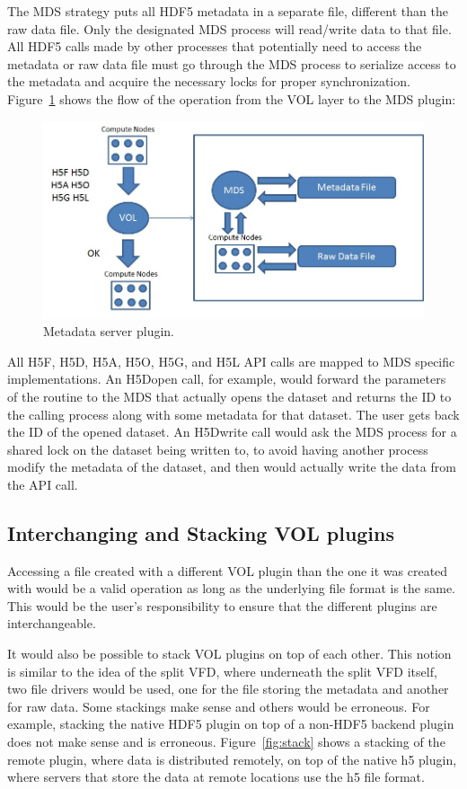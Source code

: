 \documentclass[letterpaper,hyper]{THG_RFC}
\begin{document}
The MDS strategy puts all HDF5 metadata in a separate file, different than the raw data file. Only the designated MDS process will read/write data to that file. All HDF5 calls made by other processes that potentially need to access the metadata or raw data file must go through the MDS process to serialize access to the metadata and acquire the necessary locks for proper synchronization. Figure~\ref{fig:mds} shows the flow of the operation from the VOL layer to the MDS plugin:

\begin{figure}[ht!]
\centering
\includegraphics[width=170mm]{pics/plugin-mds.jpg}
\caption{Metadata server plugin.}
\label{fig:mds}
\end{figure}

All H5F, H5D, H5A, H5O, H5G, and H5L API calls are mapped to MDS specific implementations. An H5Dopen call, for example, would forward the parameters of the routine to the MDS that actually opens the dataset and returns the ID to the calling process along with some metadata for that dataset. The user gets back the ID of the opened dataset. An H5Dwrite call would ask the MDS process for a shared lock on the dataset being written to, to avoid having another process modify the metadata of the dataset, and then would actually write the data from the API call.
\clearpage
\subsection{Interchanging and Stacking VOL plugins}
Accessing a file created with a different VOL plugin than the one it was created with would be a valid operation as long as the underlying file format is the same. This would be the user’s responsibility to ensure that the different plugins are interchangeable. 

It would also be possible to stack VOL plugins on top of each other. This notion is similar to the idea of the split VFD, where underneath the split VFD itself, two file drivers would be used, one for the file storing the metadata and another for raw data. Some stackings make sense and others would be erroneous. For example, stacking the native HDF5 plugin on top of a non-HDF5 backend plugin does not make sense and is erroneous. Figure~\ref{fig:stack} shows a stacking of the remote plugin, where data is distributed remotely, on top of the native h5 plugin, where servers that store the data at remote locations use the h5 file format.
\end{document}
